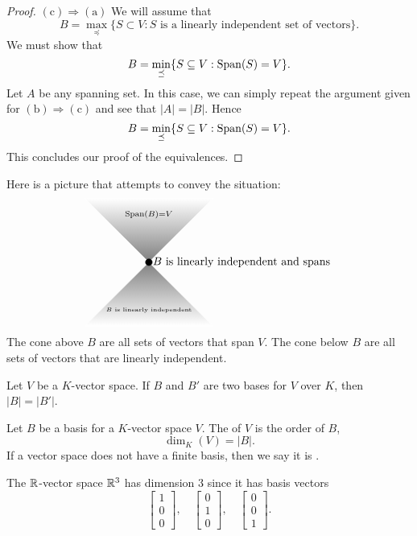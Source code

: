 \documentclass{ximera}
\begin{document}
\begin{theorem}
\begin{proof}
    $(\mathrm c)\Rightarrow(\mathrm a)$ We will assume that
    \[
    B = \max_{\preceq}\{S\subset V:\text{$S$ is a linearly independent set of vectors}\}.
    \]
    We must show that
    \[
    B = \min_{\preceq}\{S\subseteq V:\operatorname{Span}(S) = V\}.
    \]
    Let $A$ be any spanning set. In this case, we can simply repeat
    the argument given for $(\mathrm b)\Rightarrow(\mathrm c)$ and see
    that $|A| = |B|$. Hence
    \[
    B = \min_{\preceq}\{S\subseteq V:\operatorname{Span}(S) = V\}.
    \]
    This concludes our proof of the equivalences.
  \end{proof}
\end{theorem}


Here is a picture that attempts to convey the situation:
\[
\begin{tikzpicture}
  \draw[white,thin,shading = axis, top color = white, bottom color = gray] (-2,2) -- (0,0)-- (2,2) -- (-2,2) -- cycle;
  \draw[white,thin,shading = axis, bottom color = white, top color = gray] (-2,-2) -- (0,0)-- (2,-2) -- (-2,-2) -- cycle;
  \filldraw (0,0) circle (3pt);
  \node[right] at (0,0) {$B$ is linearly independent and spans};
  \node at (0,1.5) {$\scriptstyle \Span(B) = V$};
  \node at (0,-1.5) {\tiny $B$  is linearly independent};
\end{tikzpicture}
\]
The cone above $B$ are all sets of vectors that span $V$. The cone
below $B$ are all sets of vectors that are linearly independent.



\begin{corollary}
  Let $V$ be a $K$-vector space. If $B$ and $B'$ are two bases for $V$
  over $K$, then $|B| = |B'|$.
\end{corollary}


\begin{definition}
  Let $B$ be a basis for a $K$-vector space $V$. The  of $V$ is the order of $B$,
  \[
  \dim_K(V) = |B|.
  \]
  If a vector space does not have a finite basis, then we say it is
  .
\end{definition}


\begin{example}
  The $\mathbb R$-vector space $\mathbb R^3$ has dimension $3$ since it has basis vectors
  \[
  \begin{bmatrix}
    1\\
    0\\
    0
  \end{bmatrix},\quad
  \begin{bmatrix}
    0\\
    1\\
    0
  \end{bmatrix},\quad
   \begin{bmatrix}
    0\\
    0\\
    1
  \end{bmatrix}.
  \]
\end{example}
\end{document}
